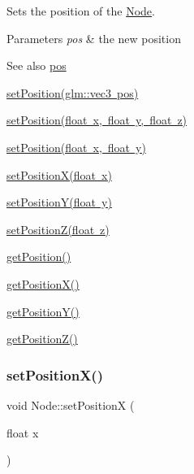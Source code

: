 Sets the position of the \mbox{\hyperlink{classsage_1_1Node}{Node}}. 


\begin{DoxyParams}{Parameters}
{\em pos} & the new position \\
\hline
\end{DoxyParams}
\begin{DoxySeeAlso}{See also}
\mbox{\hyperlink{classsage_1_1Node_a26c32e5ec11e0ed7f33053ecac6830d5}{pos}} 

\mbox{\hyperlink{classsage_1_1Node_a12f5d88d221aa5db70c2bd53f6dc049a}{set\+Position(glm\+::vec3 pos)}} 

\mbox{\hyperlink{classsage_1_1Node_ad9899110e543c6b16997512e47c142c9}{set\+Position(float x, float y, float z)}} 

\mbox{\hyperlink{classsage_1_1Node_aaa8545c103ef1b35e5076dbedab93af5}{set\+Position(float x, float y)}} 

\mbox{\hyperlink{classsage_1_1Node_ae1dfc73d6122a95778d5d9db3d1fd913}{set\+Position\+X(float x)}} 

\mbox{\hyperlink{classsage_1_1Node_a5c97d36655f0daa71a5f6c715d2b0470}{set\+Position\+Y(float y)}} 

\mbox{\hyperlink{classsage_1_1Node_a0dd2e816d50418b9b63a78fdf166ba53}{set\+Position\+Z(float z)}} 

\mbox{\hyperlink{classsage_1_1Node_a11fbdf2a2dcdf8bdc014df65f3003925}{get\+Position()}} 

\mbox{\hyperlink{classsage_1_1Node_a17e92da5beaeb4b299c4e93729a22b1a}{get\+Position\+X()}} 

\mbox{\hyperlink{classsage_1_1Node_a26337a40b7da400233451b71e85759cc}{get\+Position\+Y()}} 

\mbox{\hyperlink{classsage_1_1Node_a0c6023aabdeeff9cf981ad81e6aaed9c}{get\+Position\+Z()}} 
\end{DoxySeeAlso}
\mbox{\label{classsage_1_1Node_ae1dfc73d6122a95778d5d9db3d1fd913}} 
\subsubsection{\texorpdfstring{setPositionX()}{setPositionX()}}
{\footnotesize\ttfamily void Node\+::set\+PositionX (\begin{DoxyParamCaption}\item[{float}]{x }\end{DoxyParamCaption})}



